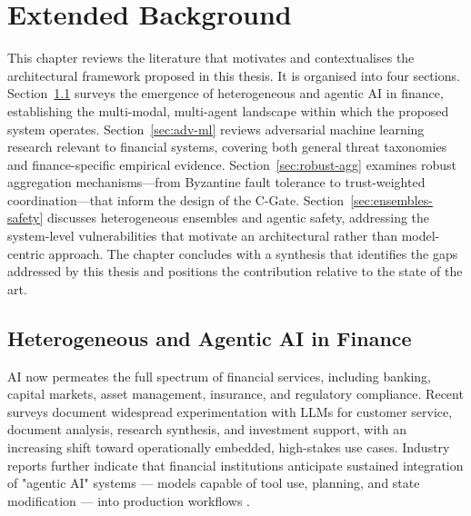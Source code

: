 \chapter{Extended Background} \label{cha:extendBackground}

This chapter reviews the literature that motivates and contextualises the architectural framework proposed in this thesis. It is organised into four sections. Section~\ref{sec:hetero-agentic} surveys the emergence of heterogeneous and agentic AI in finance, establishing the multi-modal, multi-agent landscape within which the proposed system operates. Section~\ref{sec:adv-ml} reviews adversarial machine learning research relevant to financial systems, covering both general threat taxonomies and finance-specific empirical evidence. Section~\ref{sec:robust-agg} examines robust aggregation mechanisms---from Byzantine fault tolerance to trust-weighted coordination---that inform the design of the C-Gate. Section~\ref{sec:ensembles-safety} discusses heterogeneous ensembles and agentic safety, addressing the system-level vulnerabilities that motivate an architectural rather than model-centric approach. The chapter concludes with a synthesis that identifies the gaps addressed by this thesis and positions the contribution relative to the state of the art.

\section{Heterogeneous and Agentic AI in Finance} \label{sec:hetero-agentic}
AI now permeates the full spectrum of financial services, including banking, capital markets, asset management, insurance, and regulatory compliance. Recent surveys document widespread experimentation with LLMs for customer service, document analysis, research synthesis, and investment support, with an increasing shift toward operationally embedded, high-stakes use cases. Industry reports further indicate that financial institutions anticipate sustained integration of "agentic AI" systems — models capable of tool use, planning, and state modification — into production workflows \cite{saha2025genai}.

